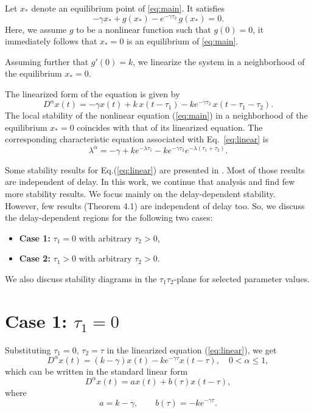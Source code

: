 \documentclass[11pt]{article}
\theoremstyle{remark}
\begin{document}
	
	Let \( x_* \) denote an equilibrium point of \eqref{eq:main}. It satisfies
	\[
	-\gamma x_* + g(x_*) - e^{-\gamma \tau_2}\, g(x_*) = 0.
	\]
	Here, we assume $g$ to be a nonlinear function such that \( g(0) = 0 \), it immediately follows that \( x_* = 0 \) is an equilibrium of \eqref{eq:main}.
	
	Assuming further that \( g'(0) = k \), we linearize the system in a neighborhood of the equilibrium \( x_* = 0 \).
	
	The linearized form of the equation is given by
	\begin{equation}
		D^{\alpha} x(t)
		= -\gamma x(t)
		+ k\,x(t - \tau_1)
		- k e^{-\gamma \tau_2}\, x(t - \tau_1 - \tau_2).
		\label{eq:linear}
	\end{equation}
	The local stability of the nonlinear equation (\ref{eq:main}) in a neighborhood of the equilibrium $x_*=0$ coincides with that of its linearized equation.
	The corresponding characteristic equation associated with Eq.~\eqref{eq:linear} is
	\begin{equation}
		\lambda^{\alpha}
		= -\gamma
		+ k e^{-\lambda \tau_1}
		- k e^{-\gamma \tau_2} e^{-\lambda(\tau_1 + \tau_2)}.
		\label{eq:char}
	\end{equation}
	
	Some stability results for Eq.(\ref{eq:linear}) are presented in \cite{dutta2025some}. Most of those results are independent of delay. In this work, we continue that analysis and find few more stability results. We focus mainly on the delay-dependent stability. However, few results (Theorem 4.1) are independent of delay too. So, we discuss the delay-dependent regions for the following two cases: 
	\begin{itemize}
		\item \textbf{Case 1:} \( \tau_1 = 0 \) with arbitrary \( \tau_2 > 0 \),
		\item \textbf{Case 2:} \( \tau_1 > 0 \) with arbitrary \( \tau_2 > 0 \).
	\end{itemize}
	We also discuss stability diagrams in the \( \tau_1 \tau_2 \)-plane for selected parameter values.
	
	\section{Case 1: \texorpdfstring{$\tau_1 = 0$}{tau1 = 0}}
	\label{sec:C1}
	Substituting $\tau_1 = 0$, $\tau_2 = \tau$ in the linearized equation (\ref{eq:linear}), we get
	\begin{equation}
		D^\alpha x(t) = (k - \gamma) x(t) - k e^{-\gamma \tau} x(t - \tau), \quad 0 < \alpha \le 1,
		\label{eq:case1}
	\end{equation}
	which can be written in the standard linear form
	\begin{equation}
		D^\alpha x(t) = a x(t) + b(\tau) x(t - \tau),
		\label{c1:lin}
	\end{equation}
	where
	\[
	a = k - \gamma, \qquad b(\tau) = -k e^{-\gamma \tau}.
	\]
	
\end{document}
